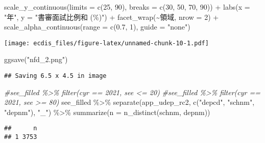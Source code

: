 \documentclass[
]{article}
\newenvironment{Shaded}{\begin{snugshade}}{\end{snugshade}}
\newcommand{\AttributeTok}[1]{\textcolor[rgb]{0.77,0.63,0.00}{#1}}
\newcommand{\CommentTok}[1]{\textcolor[rgb]{0.56,0.35,0.01}{\textit{#1}}}
\newcommand{\DecValTok}[1]{\textcolor[rgb]{0.00,0.00,0.81}{#1}}
\newcommand{\FloatTok}[1]{\textcolor[rgb]{0.00,0.00,0.81}{#1}}
\newcommand{\FunctionTok}[1]{\textcolor[rgb]{0.00,0.00,0.00}{#1}}
\newcommand{\NormalTok}[1]{#1}
\newcommand{\SpecialCharTok}[1]{\textcolor[rgb]{0.00,0.00,0.00}{#1}}
\newcommand{\StringTok}[1]{\textcolor[rgb]{0.31,0.60,0.02}{#1}}
\begin{document}
\begin{Shaded}
\begin{Highlighting}[]
  \FunctionTok{scale\_y\_continuous}\NormalTok{(}\AttributeTok{limits =} \FunctionTok{c}\NormalTok{(}\DecValTok{25}\NormalTok{, }\DecValTok{90}\NormalTok{), }\AttributeTok{breaks =} \FunctionTok{c}\NormalTok{(}\DecValTok{30}\NormalTok{, }\DecValTok{50}\NormalTok{, }\DecValTok{70}\NormalTok{, }\DecValTok{90}\NormalTok{)) }\SpecialCharTok{+}
  \FunctionTok{labs}\NormalTok{(}\AttributeTok{x =} \StringTok{"年"}\NormalTok{, }\AttributeTok{y =} \StringTok{"書審面試比例和 (\%)"}\NormalTok{) }\SpecialCharTok{+}
  \FunctionTok{facet\_wrap}\NormalTok{(}\SpecialCharTok{\textasciitilde{}}\NormalTok{領域, }\AttributeTok{nrow =} \DecValTok{2}\NormalTok{) }\SpecialCharTok{+}
  \FunctionTok{scale\_alpha\_continuous}\NormalTok{(}\AttributeTok{range =} \FunctionTok{c}\NormalTok{(}\FloatTok{0.7}\NormalTok{, }\DecValTok{1}\NormalTok{), }\AttributeTok{guide =} \StringTok{"none"}\NormalTok{)}
\end{Highlighting}
\end{Shaded}

\texttt{[image: ecdis\_files/figure-latex/unnamed-chunk-10-1.pdf]}

\begin{Shaded}
\begin{Highlighting}[]
\FunctionTok{ggsave}\NormalTok{(}\StringTok{"nfd\_2.png"}\NormalTok{)}
\end{Highlighting}
\end{Shaded}

\begin{verbatim}
## Saving 6.5 x 4.5 in image
\end{verbatim}

\begin{Shaded}
\begin{Highlighting}[]
\CommentTok{\#see\_filled \%\textgreater{}\% filter(cyr == 2021, see \textless{}= 20)}
\CommentTok{\#see\_filled \%\textgreater{}\% filter(cyr == 2021, see \textgreater{}= 80)}
\NormalTok{see\_filled }\SpecialCharTok{\%\textgreater{}\%} 
  \FunctionTok{separate}\NormalTok{(app\_udep\_rc2, }\FunctionTok{c}\NormalTok{(}\StringTok{"depcd"}\NormalTok{, }\StringTok{"schnm"}\NormalTok{, }\StringTok{"depnm"}\NormalTok{), }\StringTok{"\_"}\NormalTok{) }\SpecialCharTok{\%\textgreater{}\%}
  \FunctionTok{summarize}\NormalTok{(}\AttributeTok{n =} \FunctionTok{n\_distinct}\NormalTok{(schnm, depnm))}
\end{Highlighting}
\end{Shaded}

\begin{verbatim}
##      n
## 1 3753
\end{verbatim}
\end{document}
